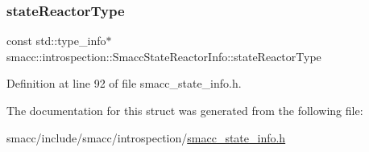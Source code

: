 \subsubsection{\texorpdfstring{state\+Reactor\+Type}{stateReactorType}}
{\footnotesize\ttfamily const std\+::type\+\_\+info$\ast$ smacc\+::introspection\+::\+Smacc\+State\+Reactor\+Info\+::state\+Reactor\+Type}



Definition at line 92 of file smacc\+\_\+state\+\_\+info.\+h.



The documentation for this struct was generated from the following file\+:\begin{DoxyCompactItemize}
\item 
smacc/include/smacc/introspection/\hyperlink{smacc__state__info_8h}{smacc\+\_\+state\+\_\+info.\+h}\end{DoxyCompactItemize}
